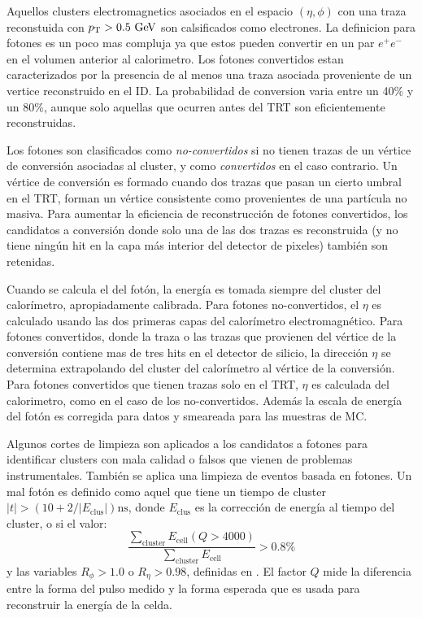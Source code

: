 Aquellos clusters electromagnetics asociados en el espacio $(\eta,\phi)$ con una traza
reconstuida con $\pt > 0.5 \gev$ son calsificados como electrones. La definicion para fotones es
un poco mas compluja ya que estos pueden convertir en un par $e^+e^-$ en el volumen anterior
al calorimetro. Los fotones convertidos estan caracterizados por la presencia de al menos
una traza asociada proveniente de un vertice reconstruido en el ID. La probabilidad
de conversion varia entre un 40\% y un 80\%, aunque solo aquellas que ocurren
antes del TRT son eficientemente reconstruidas.



Los fotones son clasificados como \emph{no-convertidos} si no tienen trazas de
un vértice de conversión asociadas al cluster, y como \emph{convertidos} en el
caso contrario. Un vértice de conversión es formado cuando dos trazas que pasan
un cierto umbral en el TRT, forman un vértice consistente como provenientes de
una partícula no masiva.
Para aumentar la eficiencia de reconstrucción de fotones convertidos, los
candidatos a conversión donde solo una de las dos trazas es reconstruida (y no
tiene ningún hit en la capa más interior del detector de pixeles) también son
retenidas.


Cuando se calcula el {\pt} del fotón, la energía es tomada siempre del cluster
del calorímetro, apropiadamente calibrada\cite{Banfi:1259219}. Para fotones
no-convertidos, el $\eta$ es calculado usando las dos primeras capas del
calorímetro electromagnético. Para fotones convertidos, donde la traza o las
trazas que provienen del vértice de la conversión contiene mas de tres hits en
el detector de silicio, la dirección $\eta$ se determina extrapolando del
cluster del calorímetro al vértice de la conversión. Para fotones convertidos
que tienen trazas solo en el TRT, $\eta$ es calculada del calorimetro, %
como en el caso de los no-convertidos. Además la escala de energía
del fotón es corregida para datos y smeareada para las muestras de MC.


Algunos cortes de limpieza son aplicados a los candidatos a fotones para
identificar clusters con mala calidad o falsos que vienen de problemas
instrumentales.
También se aplica una limpieza de eventos basada en fotones. Un mal fotón
es definido como aquel que tiene un tiempo de cluster $|t|>(10+2/|E_\text{clus}|) \text{ns}$,
donde $E_\text{clus}$ es la corrección de energía al tiempo del cluster,
o si el valor:
\begin{equation}
  \frac{\sum_\text{cluster} E_\text{cell}(Q>4000)}{\sum_\text{cluster} E_\text{cell} } > 0.8\%
\end{equation}
%
y las variables $R_\phi > 1.0$ o $R_\eta > 0.98$, definidas
en \cite{PhotonCleaning}. El factor $Q$ mide la diferencia entre la forma
del pulso medido y la forma esperada que es usada para reconstruir
la energía de la celda.

